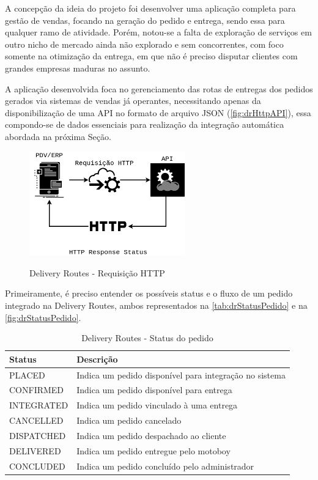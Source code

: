 A concepção da ideia do projeto foi desenvolver uma aplicação completa para gestão de vendas, focando na geração do pedido e entrega, sendo essa para qualquer ramo de atividade. Porém, notou-se a falta de exploração de serviços em outro nicho de mercado ainda não explorado e sem concorrentes, com foco somente na otimização da entrega, em que não é preciso disputar clientes com grandes empresas maduras no assunto.
 
A aplicação desenvolvida foca no gerenciamento das rotas de entregas dos pedidos gerados via sistemas de vendas já operantes, necessitando apenas da disponibilização de uma API no formato de arquivo JSON (\autoref{fig:drHttpAPI}), essa compondo-se de dados essenciais para realização da integração automática abordada na próxima Seção.
 
  \begin{figure}[H]
    \centering
    \caption{Delivery Routes - Requisição HTTP}
    \includegraphics[width=0.6\textwidth]{./dados/figuras/fig16}
    \label{fig:drHttpAPI}
\end{figure}

Primeiramente, é preciso entender os possíveis status e o fluxo de um pedido integrado na Delivery Routes, ambos representados na \autoref{tab:drStatusPedido} e na \autoref{fig:drStatusPedido}.

\begin{table}[H]
    \centering
    \caption{Delivery Routes - Status do pedido
    \label{tab:drStatusPedido}}
\begin{tabular}{ll}
\toprule
\textbf{Status} & \textbf{Descrição} \\
\midrule
PLACED & Indica um pedido disponível para integração no sistema \\
CONFIRMED & Indica um pedido disponível para entrega \\
INTEGRATED & Indica um pedido vinculado à uma entrega \\
CANCELLED\textit{} & Indica um pedido cancelado \\
DISPATCHED & Indica um pedido despachado ao cliente \\
DELIVERED & Indica um pedido entregue pelo motoboy \\
CONCLUDED & Indica um pedido concluído pelo administrador \\
\bottomrule
\end{tabular}
\end{table}
 
